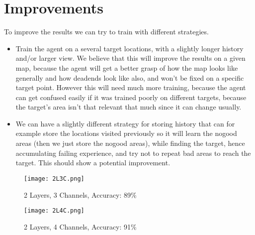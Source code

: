 \documentclass[a4paper]{article}
\begin{document}
\section{Improvements}
To improve the results we can try to train with different strategies.
\begin{itemize}
\item Train the agent on a several target locations, with a slightly longer history and/or larger view. We believe that this will improve the results on a given map, because the agent will get a better grasp of how the map looks like generally and how deadends look like also, and won't be fixed on a specific target point. However this will need much more training, because the agent can get confused easily if it was trained poorly on different targets, because the target's area isn't that relevant that much since it can change usually.

\item We can have a slightly different strategy for storing history that can for example store the locations visited previously so it will learn the nogood areas (then we just store the nogood areas), while finding the target, hence accumulating failing experience, and try not to repeat bad areas to reach the target. This should show a potential improvement.

\end{itemize}



\iffalse
\begin{figure}[h]
\centerline{\texttt{[image: 2L3C.png]}}
\caption{2 Layers, 3 Channels, Accuracy: 89\%}\label{placeholder}
\end{figure}

\begin{figure}[h]
\centerline{\texttt{[image: 2L4C.png]}}
\caption{2 Layers, 4 Channels, Accuracy: 91\%}\label{placeholder}
\end{figure}
\end{document}
